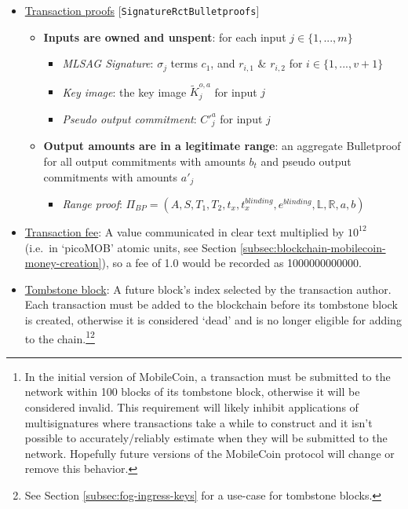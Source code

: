 \begin{itemize}
    \item \underline{Transaction proofs} [{\tt SignatureRctBulletproofs}]
    \begin{itemize}
        \item \textbf{Inputs are owned and unspent}: for each input $j \in \{1,...,m\}$
        \begin{itemize}
            \item \textit{MLSAG Signature}: $\sigma_j$ terms $c_1$, and $r_{i,1}$ \& $r_{i,2}$ for $i \in \{1,...,v+1\}$
            \item \textit{Key image}: the key image $\tilde{K}^{o,a}_j$ for input $j$
            \item \textit{Pseudo output commitment}: $C'^{a}_j$ for input $j$
        \end{itemize}
        \item \textbf{Output amounts are in a legitimate range}: an aggregate Bulletproof for all output commitments with amounts $b_t$ and pseudo output commitments with amounts $a'_j$
        \begin{itemize}
            \item \textit{Range proof}: $\Pi_{BP} = (A, S, T_1, T_2, t_x, t^{blinding}_x, e^{blinding}, \mathbb{L}, \mathbb{R}, a, b)$
        \end{itemize}
    \end{itemize}

    \item \underline{Transaction fee}: A value communicated in clear text multiplied by $10^{12}$ (i.e.\ in `picoMOB' atomic units, see Section \ref{subsec:blockchain-mobilecoin-money-creation}), so a fee of 1.0 would be recorded as 1000000000000.
    \item \underline{Tombstone block}: A future block's index selected by the transaction author. Each transaction must be added to the blockchain before its tombstone block is created, otherwise it is considered `dead' and is no longer eligible for adding to the chain.\footnote{In the initial version of MobileCoin, a transaction must be submitted to the network within 100 blocks of its tombstone block, otherwise it will be considered invalid. This requirement will likely inhibit applications of multisignatures \cite{ztm-2} where transactions take a while to construct and it isn't possible to accurately/reliably estimate when they will be submitted to the network. Hopefully future versions of the MobileCoin protocol will change or remove this behavior.}\footnote{See Section \ref{subsec:fog-ingress-keys} for a use-case for tombstone blocks.}
\end{itemize}



